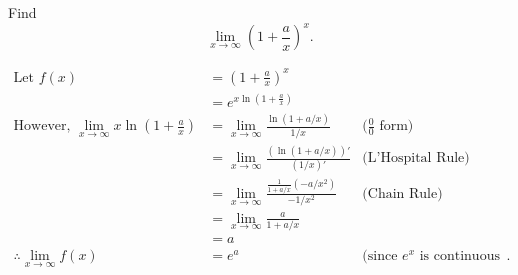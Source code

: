\documentclass[boxes, qed]{homework}
\begin{document}
\begin{problem}Find $$\lim_{x\to\infty}(1+\frac{a}{x})^x.$$
\end{problem}
\begin{solution}
  \begin{align*}
    \text{Let } f(x)&=(1+\frac{a}{x})^x\\
    &=e^{x\ln(1+\frac{a}{x})}\\
    \text{However, } \lim_{x\to\infty}x\ln(1+\frac{a}{x})
    &=\lim_{x\to\infty}\frac{\ln(1+a/x)}{1/x}
      &\text{($\frac{0}{0}$ form)}\\
    &=\lim_{x\to\infty}\frac{(\ln(1+a/x))'}{(1/x)'}
      &\text{(L'Hospital Rule)}\\
    &=\lim_{x\to\infty}\frac
      {\frac{1}{1+a/x}(-a/x^2)}
      {-1/x^2}
      &\text{(Chain Rule)}\\
    &=\lim_{x\to\infty}\frac{a}{1+a/x}\\
    &=a\\
    \therefore
    \lim_{x\to\infty}f(x)
    &=e^a
    &\text{(since $e^x$ is continuous everywhere)}.
  \end{align*}
\end{solution}
\end{document}
